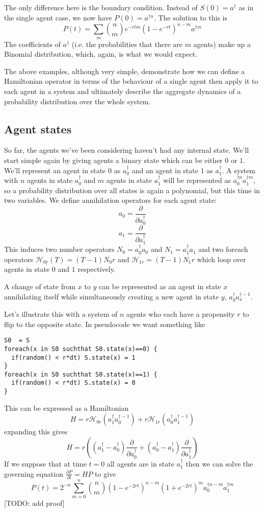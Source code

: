 \documentclass[letterpaper,twocolumn,10pt]{article}
\begin{document}
The only difference here is the boundary condition. Instead of $S(0) = a^\dag$ as in the single agent case, we now have $P(0) = a^{\dag n}$. The solution to this is
\[
P(t) = \sum_m{n\choose m}e^{-rtm}(1-e^{-rt})^{n-m}a^{\dag m}
\]
The coefficients of $a^\dag$ (i.e. the probabilities that there are $m$ agents) make up a Binomial distribution, which, again, is what we would expect.

The above examples, although very simple, demonstrate how we can define a Hamiltonian operator in terms of the behaviour of a single agent then apply it to each agent in a system and ultimately describe the aggregate dynamics of a probability distribution over the whole system.



\subsection{Agent states}

So far, the agents we've been considering haven't had any internal state. We'll start simple again by giving agents a binary state which can be either $0$ or $1$. We'll represent an agent in state $0$ as $a^\dag_0$ and an agent in state $1$ as $a^\dag_1$. A system with $n$ agents in state $a^\dag_0$ and $m$ agents in state $a^\dag_1$ will be represented as $a^{\dag n}_0 a^{\dag m}_1$, so a probability distribution over all states is again a polynomial, but this time in two variables. We define annihilation operators for each agent state:
\[
a_0 = \frac{\partial}{\partial a^\dag_0}
\]
\[
a_1 = \frac{\partial}{\partial a^\dag_1}
\]
This induces two number operators $N_0 = a_0^\dag a_0$ and $N_1 = a_1^\dag a_1$ and two foreach operators $\mathcal{H}_{0r}(T) = (T-1)N_0r$ and $\mathcal{H}_{1r} = (T-1)N_1r$ which loop over agents in state $0$ and $1$ respectively.

A change of state from $x$ to $y$ can be represented as an agent in state $x$ annihilating itself while simultaneously creating a new agent in state $y$, $a_y^\dag a_x^{\dag-1}$.

Let's illustrate this with a system of $n$ agents who each have a propensity $r$ to flip to the opposite state. In pseudocode we want something like
\begin{verbatim}
S0  = S
foreach(x in S0 suchthat S0.state(x)==0) {
  if(random() < r*dt) S.state(x) = 1
}
foreach(x in S0 suchthat S0.state(x)==1) {
  if(random() < r*dt) S.state(x) = 0
}
\end{verbatim}
 This can be expressed as a Hamiltonian
\[
H = r\mathcal{H}_{0r}(a^\dag_1 a^{\dag -1}_0) + r\mathcal{H}_{1r}(a^\dag_0 a^{\dag -1}_1)
\]
expanding this gives
\[
H = r\left((a^\dag_1 - a^\dag_0)\frac{\partial}{\partial a^\dag_0} + (a^\dag_0 - a^\dag_1)\frac{\partial}{\partial a^\dag_1}\right)
\]
If we suppose that at time $t = 0$ all agents are in state $a^\dag_1$ then we can solve the governing equation $\frac{\partial P}{\partial t} = HP$ to give
\[
P(t) = 2^{-n} \sum_{m=0}^n {n\choose m} (1-e^{-2rt})^{n-m}(1+e^{-2rt})^m a^{\dag n-m}_0 a^{\dag m}_1
\]
[TODO: add proof]
\end{document}
